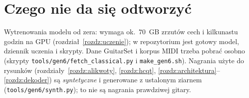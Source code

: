 \section*{Czego nie da się odtworzyć}
Wytrenowania modelu od zera: wymaga ok.\ $70$~GB zrzutów cech i kilkunastu godzin na GPU (rozdział~\ref{rozdz:uczenie}); w repozytorium jest gotowy model, dziennik uczenia i skrypty. Dane GuitarSet i korpus MIDI trzeba pobrać osobno (skrypty \texttt{tools/gen6/fetch\_classical.py} i \texttt{make\_gen6.sh}).
Nagrania użyte do rysunków (rozdziały~\ref{rozdz:alikwoty}, \ref{rozdz:hcqt}, \ref{rozdz:architektura}--\ref{rozdz:dekoder}) są \emph{syntetyczne} i generowane z ustalonym ziarnem (\texttt{tools/gen6/synth.py}); to nie są nagrania prawdziwej gitary.
